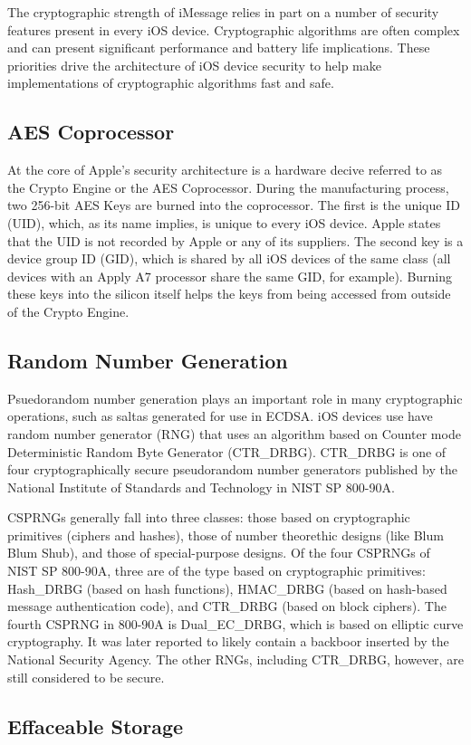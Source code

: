 The cryptographic strength of iMessage relies in part on a number of security
features present in every iOS device. Cryptographic algorithms are often
complex and can present significant performance and battery life implications.
These priorities drive the architecture of iOS device security to help make
implementations of cryptographic algorithms fast and safe.

\subsection{AES Coprocessor}
At the core of Apple's security architecture is a hardware decive referred to
as the Crypto Engine or the AES Coprocessor. During the manufacturing process,
two 256-bit AES Keys are burned into the coprocessor. The first is the unique
ID (UID), which, as its name implies, is unique to every iOS device. Apple
states that the UID is not recorded by Apple or any of its
suppliers\cite{apple}. The second key is a device group ID (GID), which is
shared by all iOS devices of the same class (all devices with an Apply A7
processor share the same GID, for example). Burning these keys into the silicon
itself helps the keys from being accessed from outside of the Crypto Engine.

\subsection{Random Number Generation}
Psuedorandom number generation plays an important role in many cryptographic
operations, such as saltas generated for use in ECDSA. iOS devices use have
random number generator (RNG) that uses an algorithm based on Counter mode
Deterministic Random Byte Generator (CTR_DRBG).  CTR_DRBG is one of four
cryptographically secure pseudorandom number generators published by the
National Institute of Standards and Technology in NIST SP
800-90A\cite{nistsp80090a}.

CSPRNGs generally fall into three classes: those based on cryptographic
primitives (ciphers and hashes), those of number theorethic designs (like Blum
Blum Shub), and those of special-purpose designs. Of the four CSPRNGs of NIST
SP 800-90A, three are of the type based on cryptographic primitives: Hash_DRBG
(based on hash functions), HMAC_DRBG (based on hash-based message
authentication code), and CTR_DRBG (based on block ciphers). The fourth CSPRNG
in 800-90A is Dual_EC_DRBG, which is based on elliptic curve cryptography. It
was later reported to likely contain a backboor inserted by the National
Security Agency\cite{goodin}. The other RNGs, including CTR_DRBG, however, are
still considered to be secure.

\subsection{Effaceable Storage}
